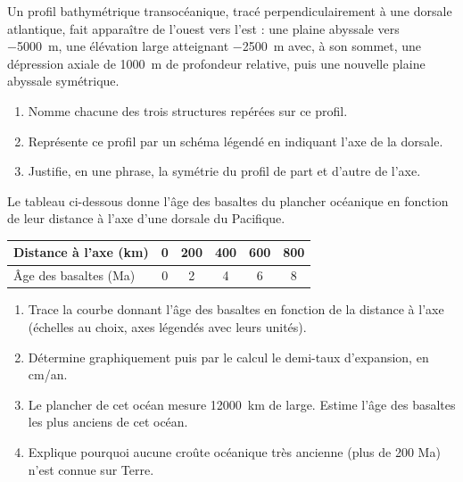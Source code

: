 \documentclass[11pt]{article}
\begin{document}
\begin{exercice}
Un profil bathymétrique transocéanique, tracé perpendiculairement à une dorsale atlantique, fait apparaître de l'ouest vers l'est : une plaine abyssale vers \SI{-5000}{m}, une élévation large atteignant \SI{-2500}{m} avec, à son sommet, une dépression axiale de \SI{1000}{m} de profondeur relative, puis une nouvelle plaine abyssale symétrique.
\begin{enumerate}
\item Nomme chacune des trois structures repérées sur ce profil.
\item Représente ce profil par un schéma légendé en indiquant l'axe de la dorsale.
\item Justifie, en une phrase, la symétrie du profil de part et d'autre de l'axe.
\end{enumerate}
\end{exercice}

\begin{exercice}
Le tableau ci-dessous donne l'âge des basaltes du plancher océanique en fonction de leur distance à l'axe d'une dorsale du Pacifique.
\begin{center}
\begin{tabular}{|l|c|c|c|c|c|}
\hline
\rowcolor{popblueL} Distance à l'axe (km) & 0 & 200 & 400 & 600 & 800 \\
\hline
Âge des basaltes (Ma) & 0 & 2 & 4 & 6 & 8 \\
\hline
\end{tabular}
\end{center}
\begin{enumerate}
\item Trace la courbe donnant l'âge des basaltes en fonction de la distance à l'axe (échelles au choix, axes légendés avec leurs unités).
\item Détermine graphiquement puis par le calcul le demi-taux d'expansion, en cm/an.
\item Le plancher de cet océan mesure \SI{12000}{km} de large. Estime l'âge des basaltes les plus anciens de cet océan.
\item Explique pourquoi aucune croûte océanique très ancienne (plus de 200 Ma) n'est connue sur Terre.
\end{enumerate}
\end{exercice}
\end{document}
